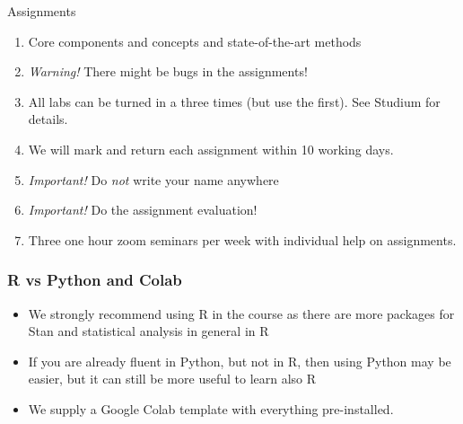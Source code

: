 \documentclass[10pt,handout]{beamer}
\begin{document}
\begin{frame}{Assignments}

\begin{enumerate}
\item Core components and concepts and state-of-the-art methods\pause
\item \emph{Warning!} There might be bugs in the assignments!\pause
\item All labs can be turned in a three times (but use the first). See Studium for details.\pause
\item We will mark and return each assignment within 10 working days.\pause
\item \emph{Important!} Do \emph{not} write your name anywhere\pause
\item \emph{Important!} Do the assignment evaluation!\pause
\item Three one hour zoom seminars per week with individual help on assignments.
\end{enumerate}
\end{frame}

\begin{frame}
  \frametitle{R vs Python and Colab}

  \begin{itemize}
    \item We strongly recommend using R in the course as there are more
    packages for Stan and statistical analysis in general in R\pause
    \item If you are already fluent in Python, but not in R, then using Python may be easier, but it can still be more useful to learn also R\pause
    \item We supply a Google Colab template with everything pre-installed.
  \end{itemize}

\end{frame}
\end{document}
